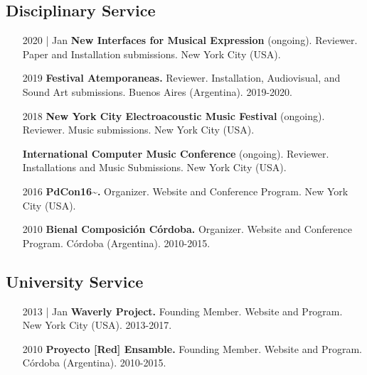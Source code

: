 \documentclass[12pt,overlapped]{res}%
\begin{document}
\begin{resume}
\subsection{Disciplinary Service}%
\fullline%
\begin{itemize}[align=parleft,leftmargin=2.25cm,labelwidth=2cm]
\item[2020 | Jan]
\textbf{New Interfaces for Musical Expression}
(ongoing). 
Reviewer. 
Paper and Installation submissions. 
New York City (USA). 
\end{itemize}%
\begin{itemize}[align=parleft,leftmargin=2.25cm,labelwidth=2cm]
\item[2019]
\textbf{Festival Atemporaneas.}
Reviewer. 
Installation, Audiovisual, and Sound Art submissions. 
Buenos Aires (Argentina). 
2019{-}2020.
\end{itemize}%
\begin{itemize}[align=parleft,leftmargin=2.25cm,labelwidth=2cm]
\item[2018]
\textbf{New York City Electroacoustic Music Festival}
(ongoing). 
Reviewer. 
Music submissions. 
New York City (USA). 
\end{itemize}%
\begin{itemize}[align=parleft,leftmargin=2.25cm,labelwidth=2cm]
\item[]
\textbf{International Computer Music Conference}
(ongoing). 
Reviewer. 
Installations and Music Submissions. 
New York City (USA). 
\end{itemize}%
\begin{itemize}[align=parleft,leftmargin=2.25cm,labelwidth=2cm]
\item[2016]
\textbf{PdCon16\textasciitilde{}.}
Organizer. 
Website and Conference Program. 
New York City (USA). 
\end{itemize}%
\begin{itemize}[align=parleft,leftmargin=2.25cm,labelwidth=2cm]
\item[2010]
\textbf{Bienal Composición Córdoba.}
Organizer. 
Website and Conference Program. 
Córdoba (Argentina). 
2010{-}2015.
\end{itemize}%
\subsection{University Service}%
\fullline%
\begin{itemize}[align=parleft,leftmargin=2.25cm,labelwidth=2cm]
\item[2013 | Jan]
\textbf{Waverly Project.}
Founding Member. 
Website and Program. 
New York City (USA). 
2013{-}2017.
\end{itemize}%
\begin{itemize}[align=parleft,leftmargin=2.25cm,labelwidth=2cm]
\item[2010]
\textbf{Proyecto {[}Red{]} Ensamble.}
Founding Member. 
Website and Program. 
Córdoba (Argentina). 
2010{-}2015.
\end{itemize}



\end{resume}
\end{document}
